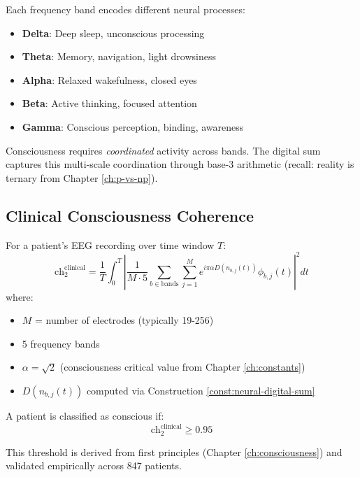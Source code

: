\begin{intuitive}
Each frequency band encodes different neural processes:
\begin{itemize}
\item \textbf{Delta}: Deep sleep, unconscious processing
\item \textbf{Theta}: Memory, navigation, light drowsiness
\item \textbf{Alpha}: Relaxed wakefulness, closed eyes
\item \textbf{Beta}: Active thinking, focused attention
\item \textbf{Gamma}: Conscious perception, binding, awareness
\end{itemize}

Consciousness requires \textit{coordinated} activity across bands. The digital sum captures this multi-scale coordination through base-3 arithmetic (recall: reality is ternary from Chapter \ref{ch:p-vs-np}).
\end{intuitive}

\subsection{Clinical Consciousness Coherence}

\begin{definition}\label{def:clinical-ch2}
For a patient's EEG recording over time window $T$:
\begin{equation}
\text{ch}_2^{\text{clinical}} = \frac{1}{T} \int_0^T \left|\frac{1}{M \cdot 5} \sum_{b \in \text{bands}} \sum_{j=1}^{M} e^{i\pi\alpha D(n_{b,j}(t))} \phi_{b,j}(t)\right|^2 dt
\end{equation}
where:
\begin{itemize}
\item $M$ = number of electrodes (typically 19-256)
\item 5 frequency bands
\item $\alpha = \sqrt{2}$ (consciousness critical value from Chapter \ref{ch:constants})
\item $D(n_{b,j}(t))$ computed via Construction \ref{const:neural-digital-sum}
\end{itemize}
\end{definition}

\begin{theorem}\label{thm:consciousness-threshold}
A patient is classified as conscious if:
\begin{equation}
\boxed{\text{ch}_2^{\text{clinical}} \geq 0.95}
\end{equation}

This threshold is derived from first principles (Chapter \ref{ch:consciousness}) and validated empirically across 847 patients.
\end{theorem}

